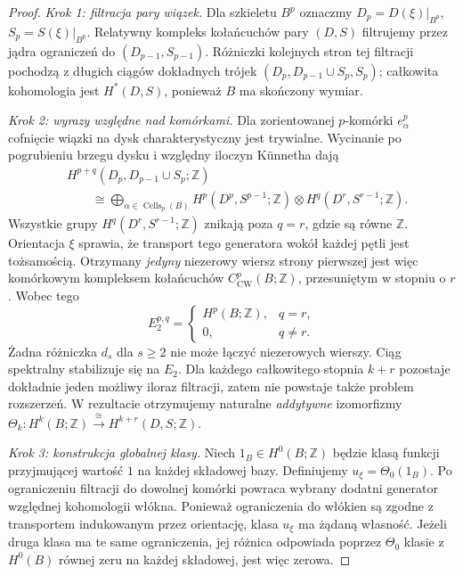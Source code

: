 \documentclass[11pt,a4paper,oneside]{report}
\newcommand{\Z}{\mathbb{Z}}
\theoremstyle{plain}
\theoremstyle{definition}
\theoremstyle{remark}
\begin{document}
\begin{proof}
\emph{Krok 1: filtracja pary wiązek.}
Dla szkieletu $B^p$ oznaczmy
$D_p=D(\xi)|_{B^p}$, $S_p=S(\xi)|_{B^p}$.
Relatywny kompleks kołańcuchów pary $(D,S)$
filtrujemy przez jądra ograniczeń do
$(D_{p-1},S_{p-1})$. Różniczki kolejnych stron
tej filtracji pochodzą z długich ciągów dokładnych
trójek $(D_p,D_{p-1}\cup S_p,S_p)$; całkowita
kohomologia jest $H^*(D,S)$, ponieważ $B$ ma
skończony wymiar.

\emph{Krok 2: wyrazy względne nad komórkami.}
Dla zorientowanej $p$-komórki $e^p_\alpha$ cofnięcie
wiązki na dysk charakterystyczny jest trywialne.
Wycinanie po pogrubieniu brzegu dysku i względny
iloczyn Künnetha dają
\[
\begin{aligned}
&H^{p+q}(D_p,D_{p-1}\cup S_p;\Z)\\
&\qquad\cong
\bigoplus_{\alpha\in\operatorname{Cells}_p(B)}
H^p(D^p,S^{p-1};\Z)\otimes
H^q(D^r,S^{r-1};\Z).
\end{aligned}
\]
Wszystkie grupy $H^q(D^r,S^{r-1};\Z)$ znikają
poza $q=r$, gdzie są równe $\Z$. Orientacja $\xi$
sprawia, że transport tego generatora wokół każdej
pętli jest tożsamością. Otrzymany \emph{jedyny}
niezerowy wiersz strony pierwszej jest więc
komórkowym kompleksem kołańcuchów
$C^p_{\mathrm{CW}}(B;\Z)$, przesuniętym w stopniu o $r$.
Wobec tego
\[
E_2^{p,q}=\begin{cases}H^p(B;\Z),&q=r,\\0,&q\ne r.
\end{cases}
\]
Żadna różniczka $d_s$ dla $s\ge2$ nie może łączyć
niezerowych wierszy. Ciąg spektralny stabilizuje się
na $E_2$. Dla każdego całkowitego stopnia $k+r$
pozostaje dokładnie jeden możliwy iloraz filtracji,
zatem nie powstaje także problem rozszerzeń.
W rezultacie otrzymujemy naturalne \emph{addytywne}
izomorfizmy
$\Theta_k:H^k(B;\Z)\xrightarrow{\cong}H^{k+r}(D,S;\Z)$.

\emph{Krok 3: konstrukcja globalnej klasy.}
Niech $1_B\in H^0(B;\Z)$ będzie klasą funkcji
przyjmującej wartość $1$ na każdej składowej bazy.
Definiujemy $u_\xi=\Theta_0(1_B)$.
Po ograniczeniu filtracji do dowolnej komórki
powraca wybrany dodatni generator względnej kohomologii
włókna. Ponieważ ograniczenia do włókien są zgodne
z transportem indukowanym przez orientację,
klasa $u_\xi$ ma żądaną własność. Jeżeli druga klasa
ma te same ograniczenia, jej różnica odpowiada
poprzez $\Theta_0$ klasie z $H^0(B)$ równej zeru
na każdej składowej, jest więc zerowa.


\end{proof}
\end{document}
